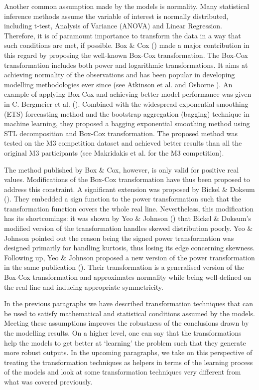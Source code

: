 Another common assumption made by the models is normality. Many statistical inference methods assume the variable of interest is normally distributed, including t-test, Analysis of Variance (ANOVA) and Linear Regression. Therefore, it is of paramount importance to transform the data in a way that such conditions are met, if possible. Box \& Cox (\citeyear{box1964analysis}) made a major contribution in this regard by proposing the well-known Box-Cox transformation. The Box-Cox transformation includes both power and logarithmic transformations. It aims at achieving normality of the observations and has been popular in developing modelling methodologies ever since (see Atkinson et al. \citeyear{atkinson2021box} and Osborne \citeyear{osborne2010improving}). An example of applying Box-Cox and achieving better model performance was given in C. Bergmeier et al. (\citeyear{bergmeir2016bagging}). Combined with the widespread exponential smoothing (ETS) forecasting method and the bootstrap aggregation (bagging) technique in machine learning, they proposed a bagging exponential smoothing method using STL decomposition and Box-Cox transformation. The proposed method was tested on the M3 competition dataset and achieved better results than all the original M3 participants (see Makridakis et al. \citeyear{makridakis2000m3} for the M3 competition).

The method published by Box \& Cox, however, is only valid for positive real values. Modifications of the Box-Cox transformation have thus been proposed to address this constraint. A significant extension was proposed by Bickel \& Doksum (\citeyear{bickel1981analysis}). They embedded a sign function to the power transformation such that the transformation function covers the whole real line. Nevertheless, this modification has its shortcomings: it was shown by Yeo \& Johnson (\citeyear{10.1093/Biomet/87.4.954}) that Bickel \& Doksum's modified version of the transformation handles skewed distribution poorly. Yeo \& Johnson pointed out the reason being the signed power transformation was designed primarily for handling kurtosis, thus losing its edge concerning skewness. Following up, Yeo \& Johnson proposed a new version of the power transformation in the same publication (\citeyear{10.1093/Biomet/87.4.954}). Their transformation is a generalised version of the Box-Cox transformation and approximates normality while being well-defined on the real line and inducing appropriate symmetricity.

In the previous paragraphs we have described transformation techniques that can be used to satisfy mathematical and statistical conditions assumed by the models. Meeting these assumptions improves the robustness of the conclusions drawn by the modelling results. On a higher level, one can say that the transformations help the models to get better at `learning' the problem such that they generate more robust outputs. In the upcoming paragraphs, we take on this perspective of treating the transformation techniques as helpers in terms of the learning process of the models and look at some transformation techniques very different from what was covered previously.

